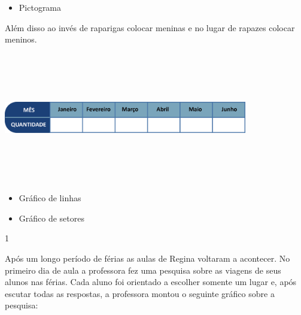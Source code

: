 \begin{escolha}
{\begin{escolha}
{%


\begin{itemize}
\item
  Pictograma
\end{itemize}


Além disso ao invés de raparigas colocar meninas e no lugar de rapazes
colocar meninos.

\includegraphics[width=4.18370in,height=2.21686in]{media/image89.png}

\begin{itemize}
\item
  Gráfico de linhas
\end{itemize}



\begin{itemize}
\item
  Gráfico de setores
\end{itemize}





\num{1}

Após um longo período de férias as aulas de Regina voltaram a acontecer.
No primeiro dia de aula a professora fez uma pesquisa sobre as viagens de seus alunos nas férias. Cada aluno foi
orientado a escolher somente um lugar e, após escutar todas as respostas,
a professora montou o seguinte gráfico sobre a pesquisa:

}
\end{escolha}}
\end{escolha}
